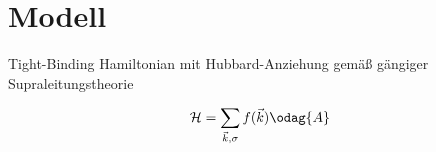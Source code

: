 \chapter{Modell}\label{sec:modell}

Tight-Binding Hamiltonian mit Hubbard-Anziehung gemäß gängiger Supraleitungstheorie

\begin{align}
    \mathcal{H} = \sum_{\vec{k}, \sigma} f(\vec{k}) \odag{A}
\end{align}


